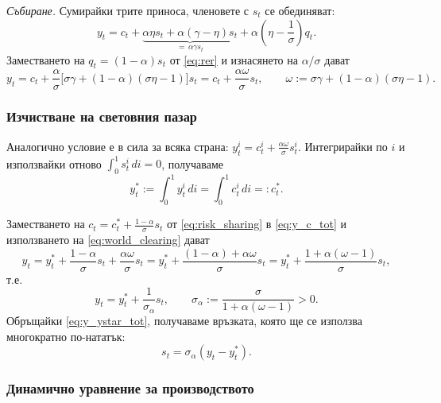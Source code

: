 \emph{Събиране.} Сумирайки трите приноса, членовете с $s_t$ се обединяват:
\begin{equation}
y_t = c_t + \underbrace{\alpha\eta s_t + \alpha(\gamma-\eta)s_t}_{= \, \alpha\gamma s_t}
+ \alpha\left( \eta - \frac{1}{\sigma} \right) q_t.
\label{eq:y_c_q}
\end{equation}
Заместването на $q_t = (1-\alpha)s_t$ от \eqref{eq:rer} и изнасянето на $\alpha/\sigma$ дават
\begin{equation}
y_t = c_t + \frac{\alpha}{\sigma}\Big[ \sigma\gamma + (1-\alpha)(\sigma\eta - 1) \Big] s_t
= c_t + \frac{\alpha\omega}{\sigma} s_t,
\qquad \omega := \sigma\gamma + (1-\alpha)(\sigma\eta - 1).
\label{eq:y_c_tot}
\end{equation}

\subsubsection*{Изчистване на световния пазар}

Аналогично условие е в сила за всяка страна: $y^i_t = c^i_t + \frac{\alpha\omega}{\sigma} s^i_t$. Интегрирайки по $i$ и използвайки отново $\int_0^1 s^i_t\, di = 0$, получаваме
\begin{equation}
y^*_t := \int_0^1 y^i_t\, di = \int_0^1 c^i_t\, di =: c^*_t.
\label{eq:world_clearing}
\end{equation}

Заместването на $c_t = c^*_t + \frac{1-\alpha}{\sigma}s_t$ от \eqref{eq:risk_sharing} в \eqref{eq:y_c_tot} и използването на \eqref{eq:world_clearing} дават
\[
y_t = y^*_t + \frac{1-\alpha}{\sigma}s_t + \frac{\alpha\omega}{\sigma}s_t
= y^*_t + \frac{(1-\alpha) + \alpha\omega}{\sigma}s_t
= y^*_t + \frac{1 + \alpha(\omega-1)}{\sigma}s_t,
\]
т.е.
\begin{equation}
y_t = y^*_t + \frac{1}{\sigma_\alpha} s_t,
\qquad \sigma_\alpha := \frac{\sigma}{1 + \alpha(\omega - 1)} > 0.
\label{eq:y_ystar_tot}
\end{equation}
Обръщайки \eqref{eq:y_ystar_tot}, получаваме връзката, която ще се използва многократно по-нататък:
\begin{equation}
s_t = \sigma_\alpha \left( y_t - y^*_t \right).
\label{eq:tot_output}
\end{equation}

\subsubsection*{Динамично уравнение за производството}

